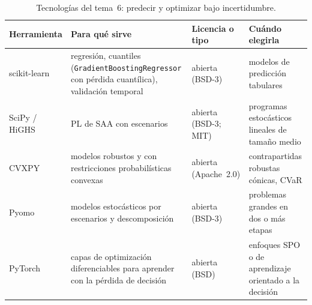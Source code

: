\begin{table}[h]
\centering\small
\caption{Tecnologías del tema~6: predecir y optimizar bajo incertidumbre.}\label{tab:tec6}
\begin{tabularx}{\textwidth}{@{}l>{\raggedright\arraybackslash}X>{\raggedright\arraybackslash}p{2.2cm}>{\raggedright\arraybackslash}X@{}}
\toprule
Herramienta & Para qué sirve & Licencia o tipo & Cuándo elegirla \\
\midrule
scikit-learn & regresión, cuantiles (\texttt{GradientBoostingRegressor} con pérdida cuantílica), validación temporal & abierta (BSD-3) & modelos de predicción tabulares \\
SciPy / HiGHS & PL de SAA con escenarios & abierta (BSD-3; MIT) & programas estocásticos lineales de tamaño medio \\
CVXPY~\cite{cvxpy} & modelos robustos y con restricciones probabilísticas convexas & abierta (Apache~2.0) & contrapartidas robustas cónicas, CVaR \\
Pyomo & modelos estocásticos por escenarios y descomposición & abierta (BSD-3) & problemas grandes en dos o más etapas \\
PyTorch & capas de optimización diferenciables para aprender con la pérdida de decisión & abierta (BSD) & enfoques SPO o de aprendizaje orientado a la decisión \\
\bottomrule
\end{tabularx}
\end{table}

\addtocounter{definicion}{1}%

